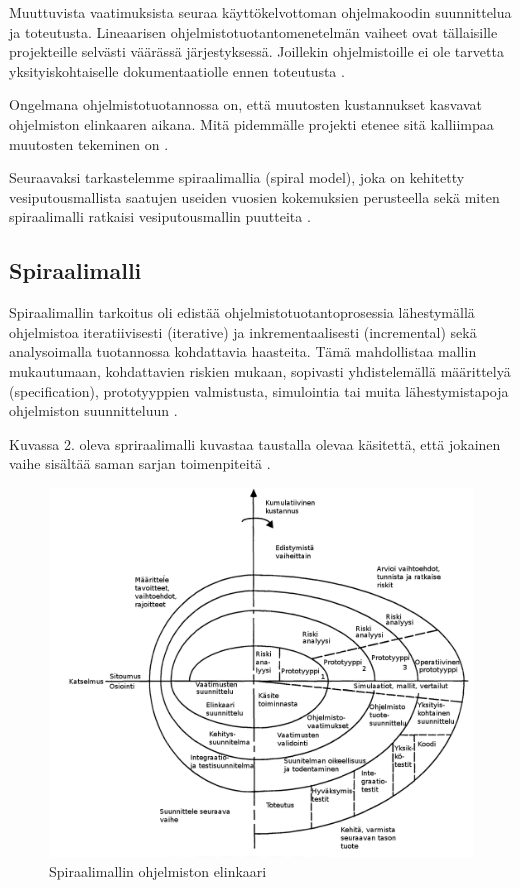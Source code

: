 \documentclass[finnish]{tktltiki2}
\theoremstyle{definition}
\theoremstyle{remark}
\begin{document}
Muuttuvista vaatimuksista seuraa käyttökelvottoman ohjelmakoodin suunnittelua ja toteutusta. Lineaarisen ohjelmistotuotantomenetelmän vaiheet ovat tällaisille projekteille selvästi väärässä järjestyksessä. Joillekin ohjelmistoille ei ole tarvetta yksityiskohtaiselle dokumentaatiolle ennen toteutusta \cite{BOE88}.

Ongelmana ohjelmistotuotannossa on, että muutosten kustannukset kasvavat ohjelmiston elinkaaren aikana. Mitä pidemmälle projekti etenee sitä kalliimpaa muutosten tekeminen on \cite{HIC01}.

Seuraavaksi tarkastelemme spiraalimallia (spiral model), joka on kehitetty vesiputousmallista saatujen useiden vuosien kokemuksien perusteella sekä miten spiraalimalli ratkaisi vesiputousmallin puutteita \cite{BOE88}.

\subsection{Spiraalimalli}

Spiraalimallin tarkoitus oli edistää ohjelmistotuotantoprosessia lähestymällä ohjelmistoa iteratiivisesti (iterative) ja inkrementaalisesti (incremental) sekä analysoimalla tuotannossa kohdattavia haasteita. Tämä mahdollistaa mallin mukautumaan, kohdattavien riskien mukaan, sopivasti yhdistelemällä määrittelyä (specification), prototyyppien valmistusta, simulointia tai muita lähestymistapoja ohjelmiston suunnitteluun \cite{BOE88}. 

Kuvassa 2. oleva spriraalimalli kuvastaa taustalla olevaa käsitettä, että jokainen vaihe sisältää saman sarjan toimenpiteitä \cite{BOE88}.

\begin{figure}[h!]
  \caption{Spiraalimallin ohjelmiston elinkaari}
  \centering
    \includegraphics[width=\textwidth]{spiral}
\end{figure}
\end{document}
